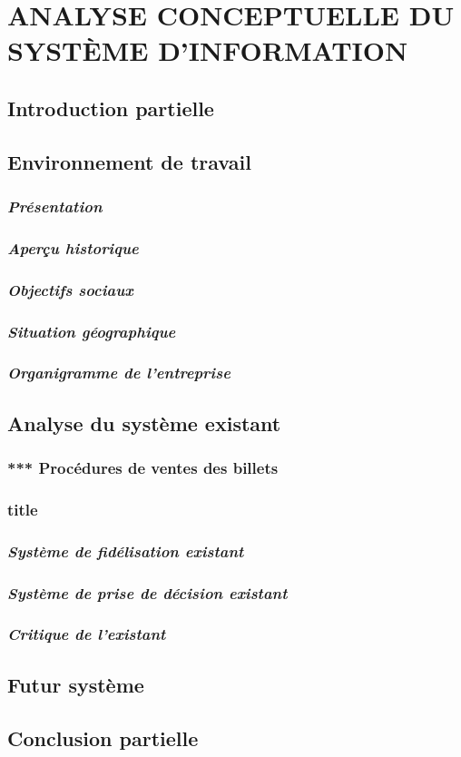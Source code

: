\chapter[ANALYSE CONCEPTUELLE DU SYSTÈME D’INFORMATION]{ANALYSE CONCEPTUELLE DU SYSTÈME D’INFORMATION}
    \section[Introduction partielle]{Introduction partielle}
    \section[Environnement de travail]{Environnement de travail}
        \subsection[Présentation]{\textit{Présentation}}
        \subsection[Aperçu historique]{\textit{Aperçu historique}}
        \subsection[Objectifs sociaux]{\textit{Objectifs sociaux}}
        \subsection[Situation géographique]{\textit{Situation géographique}}
        \subsection[Organigramme de l’entreprise]{\textit{Organigramme de l’entreprise}}
    \section[Analyse du système existant]{Analyse du système existant}
        \subsection[short]{*** Procédures de ventes des billets}
        \subsection[short]{title}
        \subsection[short]{\textit{Système de fidélisation existant}}
        \subsection[short]{\textit{Système de prise de décision existant}}
        \subsection[Critique de l’existant]{\textit{Critique de l’existant}}
    \section[Futur système]{Futur système}
    \section[Conclusion partielle]{Conclusion partielle}